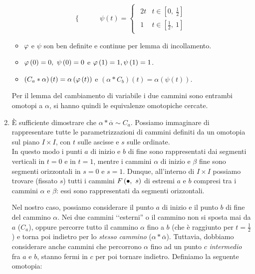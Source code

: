 \begin{demonstration}
\begin{enumerate}[label=\Roman*]
\begin{equation*}
\begin{cases}
	\end{cases}
\qquad	\psi\left(t\right)=
\begin{cases}
	\begin{array}{ll}
		2t&t\in\left[0,\ \frac{1}{2}\right]\\
		1&t\in\left[\frac{1}{2},\ 1\right]
	\end{array}
\end{cases}
\end{equation*}
\begin{itemize}
	\item $\oldphi$ e $\psi$ son ben definite e continue per lemma di incollamento.
	\item $\oldphi\left(0\right)=0,\ \psi\left(0\right)=0$ e $\oldphi\left(1\right)=1,\psi\left(1\right)=1 $.
	\item $\left(C_a\ast \alpha\right)\left(t\right)=\alpha\left(\oldphi\left(t\right)\right)$ e $\left(\alpha\ast C_b\right)\left(t\right)=\alpha\left(\psi\left(t\right)\right)$.
\end{itemize}
Per il lemma del cambiamento di variabile i due cammini sono entrambi omotopi a $\alpha$, si hanno quindi le equivalenze omotopiche cercate.
\item È sufficiente dimostrare che $\alpha\ast\overline{\alpha}\sim C_a$. Possiamo immaginare di rappresentare tutte le parametrizzazioni di cammini definiti da un omotopia sul piano $I\times I$, con $t$ sulle ascisse e $s$ sulle ordinate.\\
In questo modo i punti $a$ di inizio e $b$ di fine sono rappresentati dai segmenti verticali in $t=0$ e in $t=1$, mentre i cammini $\alpha$ di inizio e $\beta$ fine sono segmenti orizzontali in $s=0$ e $s=1$. Dunque, all'interno di $I\times I$ possiamo  trovare (fissato $s$) tutti i cammini $F\left(\bullet,\ s\right)$ di estremi $a$ e $b$ compresi tra i cammini $\alpha$ e $\beta$: essi sono rappresentati da segmenti orizzontali.\\
\begin{minipage}{.62\linewidth}
Nel nostro caso, possiamo considerare il punto $a$ di inizio e il punto $b$ di fine del cammino $\alpha$. Nei due cammini ‘‘esterni'' o il cammino non si sposta mai da $a$ ($C_a$), oppure percorre tutto il cammino $\alpha$ fino a $b$ (che è raggiunto per $t=\frac{1}{2}$) e torna poi indietro per lo \textit{stesso cammino} ($\alpha\ast\overline{\alpha}$). Tuttavia, dobbiamo considerare anche cammini che percorrono $\alpha$ fino ad un punto $c$ \textit{intermedio} fra $a$ e $b$, stanno fermi in $c$ per poi tornare indietro. Definiamo la seguente omotopia:

\end{minipage}
\end{enumerate}
\end{demonstration}

